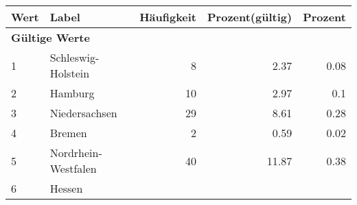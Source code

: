      \begin{longtable}{lXrrr}
     \toprule
     \textbf{Wert} & \textbf{Label} & \textbf{Häufigkeit} & \textbf{Prozent(gültig)} & \textbf{Prozent} \\
     \endhead
     \midrule
     \multicolumn{5}{l}{\textbf{Gültige Werte}}\\

     1 &
     \multicolumn{1}{X}{ Schleswig-Holstein   } &


       \num{8} &
       \num[round-mode=places,round-precision=2]{2,37} &
         \num[round-mode=places,round-precision=2]{0,08} \\

     2 &
     \multicolumn{1}{X}{ Hamburg   } &


       \num{10} &
       \num[round-mode=places,round-precision=2]{2,97} &
         \num[round-mode=places,round-precision=2]{0,1} \\

     3 &
     \multicolumn{1}{X}{ Niedersachsen   } &


       \num{29} &
       \num[round-mode=places,round-precision=2]{8,61} &
         \num[round-mode=places,round-precision=2]{0,28} \\

     4 &
     \multicolumn{1}{X}{ Bremen   } &


       \num{2} &
       \num[round-mode=places,round-precision=2]{0,59} &
         \num[round-mode=places,round-precision=2]{0,02} \\

     5 &
     \multicolumn{1}{X}{ Nordrhein-Westfalen   } &


       \num{40} &
       \num[round-mode=places,round-precision=2]{11,87} &
         \num[round-mode=places,round-precision=2]{0,38} \\

     6 &
     \multicolumn{1}{X}{ Hessen   } &



\end{longtable}

